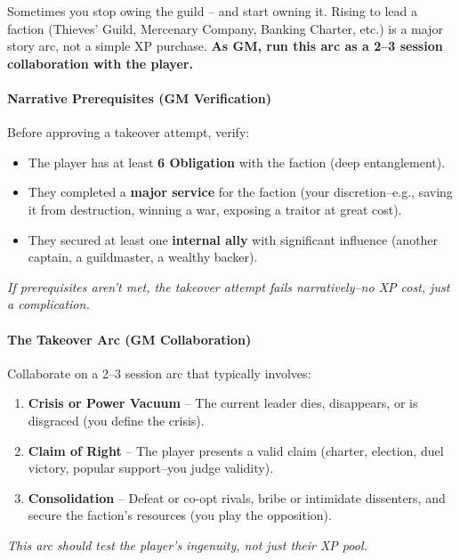 \begin{tcolorbox}[colback=black!3!white,colframe=black!60!white,title=From Faction to Asset/Follower: Taking Over a Terrestrial Patron (GM Guidance),label=sec:takeover-sidebar,breakable]
Sometimes you stop owing the guild -- and start owning it. Rising to lead a faction (Thieves' Guild, Mercenary Company, Banking Charter, etc.) is a major story arc, not a simple XP purchase. \textbf{As GM, run this arc as a 2--3 session collaboration with the player.}  

\paragraph{Narrative Prerequisites (GM Verification)}
Before approving a takeover attempt, verify:  
\begin{itemize}
  \item The player has at least \textbf{6 Obligation} with the faction (deep entanglement).  
  \item They completed a \textbf{major service} for the faction (your discretion--e.g., saving it from destruction, winning a war, exposing a traitor at great cost).  
  \item They secured at least one \textbf{internal ally} with significant influence (another captain, a guildmaster, a wealthy backer).  
\end{itemize}
\textit{If prerequisites aren't met, the takeover attempt fails narratively--no XP cost, just a complication.}

\paragraph{The Takeover Arc (GM Collaboration)}
Collaborate on a 2--3 session arc that typically involves:  
\begin{enumerate}
  \item \textbf{Crisis or Power Vacuum} -- The current leader dies, disappears, or is disgraced (you define the crisis).  
  \item \textbf{Claim of Right} -- The player presents a valid claim (charter, election, duel victory, popular support--you judge validity).  
  \item \textbf{Consolidation} -- Defeat or co-opt rivals, bribe or intimidate dissenters, and secure the faction's resources (you play the opposition).  
\end{enumerate}
\textit{This arc should test the player's ingenuity, not just their XP pool.}


\end{tcolorbox}
